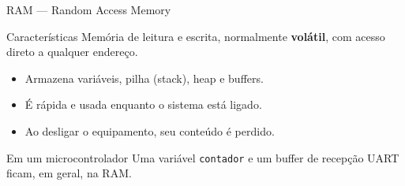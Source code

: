 \begin{frame}[t]{RAM --- Random Access Memory}
  \begin{block}{Características}
    Memória de leitura e escrita, normalmente \textbf{volátil}, com acesso direto a qualquer endereço.
  \end{block}
  \begin{itemize}
    \item Armazena variáveis, pilha (stack), heap e buffers.
    \item É rápida e usada enquanto o sistema está ligado.
    \item Ao desligar o equipamento, seu conteúdo é perdido.
  \end{itemize}
  \begin{exampleblock}{Em um microcontrolador}
    Uma variável \texttt{contador} e um buffer de recepção UART ficam, em geral, na RAM.
  \end{exampleblock}
\end{frame}
